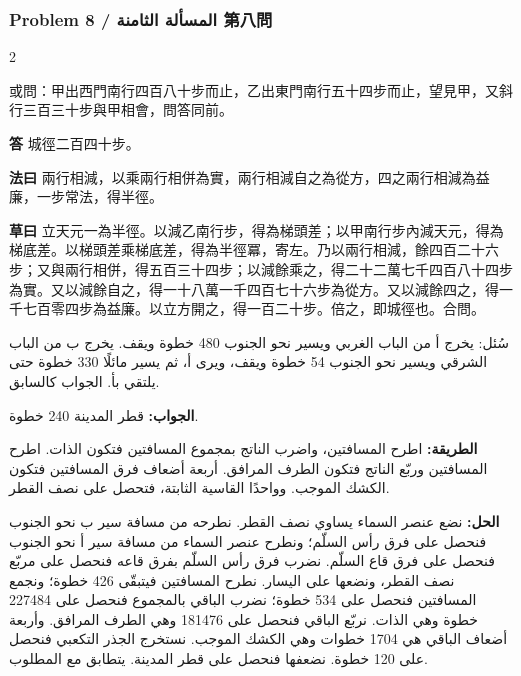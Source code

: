 \documentclass[11pt,a4paper]{article}
\newcommand{\ar}[1]{\arabicfont\beginR #1\endR}
\newcommand{\Answer}[1]{\par\noindent\textbf{\color{problemcolor}答} #1\par}
\newcommand{\Method}[1]{\par\noindent\textbf{\color{problemcolor}法曰} #1\par}
\newcommand{\Workings}[1]{\par\noindent\textbf{\color{problemcolor}草曰} #1\par}
\newcommand{\AnswerAr}{\par\noindent\textbf{\color{problemcolor}\ar{الجواب:}} }
\newcommand{\MethodAr}{\par\noindent\textbf{\color{problemcolor}\ar{الطريقة:}} }
\newcommand{\WorkingsAr}{\par\noindent\textbf{\color{problemcolor}\ar{الحل:}} }
\begin{document}
\vspace{0.5cm}

\subsubsection*{Problem 8 / \ar{المسألة الثامنة} \quad 第八問}

\begin{paracol}{2}

\noindent 或問：甲出西門南行四百八十步而止，乙出東門南行五十四步而止，望見甲，又斜行三百三十步與甲相會，問答同前。

\vspace{0.2cm}

\Answer{城徑二百四十步。}

\vspace{0.2cm}

\Method{兩行相減，以乘兩行相併為實，兩行相減自之為從方，四之兩行相減為益廉，一步常法，得半徑。}

\vspace{0.2cm}

\Workings{立天元一為半徑。以減乙南行步，得為梯頭差；以甲南行步內減天元，得為梯底差。以梯頭差乘梯底差，得為半徑冪，寄左。乃以兩行相減，餘四百二十六步；又與兩行相併，得五百三十四步；以減餘乘之，得二十二萬七千四百八十四步為實。又以減餘自之，得一十八萬一千四百七十六步為從方。又以減餘四之，得一千七百零四步為益廉。以立方開之，得一百二十步。倍之，即城徑也。合問。}

\switchcolumn

\ar{سُئل: يخرج أ من الباب الغربي ويسير نحو الجنوب 480 خطوة ويقف. يخرج ب من الباب الشرقي ويسير نحو الجنوب 54 خطوة ويقف، ويرى أ، ثم يسير مائلًا 330 خطوة حتى يلتقي بأ. الجواب كالسابق.}

\vspace{0.2cm}

\AnswerAr{قطر المدينة 240 خطوة.}

\vspace{0.2cm}

\MethodAr{اطرح المسافتين، واضرب الناتج بمجموع المسافتين فتكون الذات. اطرح المسافتين وربّع الناتج فتكون الطرف المرافق. أربعة أضعاف فرق المسافتين فتكون الكشك الموجب. وواحدًا القاسية الثابتة، فتحصل على نصف القطر.}

\vspace{0.2cm}

\WorkingsAr{نضع عنصر السماء يساوي نصف القطر. نطرحه من مسافة سير ب نحو الجنوب فنحصل على فرق رأس السلّم؛ ونطرح عنصر السماء من مسافة سير أ نحو الجنوب فنحصل على فرق قاع السلّم. نضرب فرق رأس السلّم بفرق قاعه فنحصل على مربّع نصف القطر، ونضعها على اليسار. نطرح المسافتين فيتبقّى 426 خطوة؛ ونجمع المسافتين فنحصل على 534 خطوة؛ نضرب الباقي بالمجموع فنحصل على 227484 خطوة وهي الذات. نربّع الباقي فنحصل على 181476 وهي الطرف المرافق. وأربعة أضعاف الباقي هي 1704 خطوات وهي الكشك الموجب. نستخرج الجذر التكعبي فنحصل على 120 خطوة. نضعفها فنحصل على قطر المدينة. يتطابق مع المطلوب.}

\end{paracol}
\end{document}
